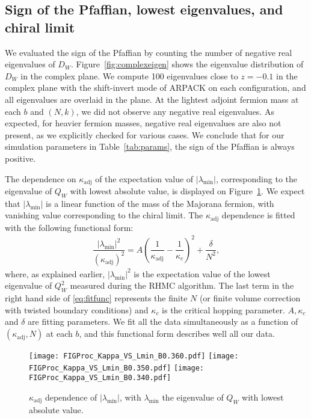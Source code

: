 \documentclass[a4paper,11pt]{article}
\begin{document}
\subsection{Sign of the Pfaffian, lowest eigenvalues, and chiral limit}
We evaluated the sign of the Pfaffian by counting the number of negative real eigenvalues of $D_W$.
Figure~\ref{fig:complexeigen} shows the eigenvalue distribution of $D_W$ in the complex plane.
We compute 100 eigenvalues close to $z=-0.1$ in the complex plane with the shift-invert mode of ARPACK on each configuration,
and all eigenvalues are overlaid in the plane.
At the lightest adjoint fermion mass at each $b$ and $(N,k)$, we did not observe any negative real eigenvalues.
As expected, for heavier fermion masses, negative real eigenvalues are
also not present, as we explicitly checked for various cases.
We conclude that for our simulation parameters in Table~\ref{tab:params}, the sign of the Pfaffian is always positive.

The dependence on $\kappa_{\mathrm{adj}}$ of the expectation value of $|\lambda_{\mathrm{min}}|$, corresponding to the eigenvalue 
of $Q_W$ with lowest absolute value, is displayed on Figure~\ref{fig:lambdavskappa}.
We expect that $|\lambda_{\mathrm{min}}|$ is a linear function of the mass of the Majorana fermion, with vanishing value
corresponding to the chiral limit.
The $\kappa_{\mathrm{adj}}$ dependence is fitted with the following functional form:
\begin{align}
  \dfrac{\left|\lambda_{\mathrm{min}}\right|^2}{\left(\kappa_{\mathrm{adj}}\right)^2}
  = A\left(\dfrac{1}{\kappa_{\mathrm{adj}}}-\dfrac{1}{\kappa_{c}}\right)^2 + \dfrac{\delta}{N^2},
  \label{eq:fitfunc}
\end{align}
where, as explained earlier,  $\left|\lambda_{\mathrm{min}}\right|^2$ is the expectation value of the lowest eigenvalue of $Q_W^2$
measured during the RHMC algorithm.
The last term in the right hand side of \eqref{eq:fitfunc} represents the finite $N$ (or finite volume correction
with twisted boundary conditions) and $\kappa_c$ is the critical hopping parameter.
$A, \kappa_{c}$ and $\delta$ are fitting parameters.
We fit all the data simultaneously as a function of $(\kappa_{\mathrm{adj}}, N)$ at each $b$, and
this functional form describes well all our data.

\begin{figure}[t]
    \centering
    \texttt{[image: FIGProc\_Kappa\_VS\_Lmin\_B0.360.pdf]}
    \texttt{[image: FIGProc\_Kappa\_VS\_Lmin\_B0.350.pdf]}
    \texttt{[image: FIGProc\_Kappa\_VS\_Lmin\_B0.340.pdf]}
    \caption{$\kappa_{\mathrm{adj}}$ dependence of $|\lambda_{\mathrm{min}}|$, with $\lambda_{\mathrm{min}}$ the eigenvalue 
of $Q_W$ with lowest absolute value.}
    \label{fig:lambdavskappa}
\end{figure}
\end{document}
